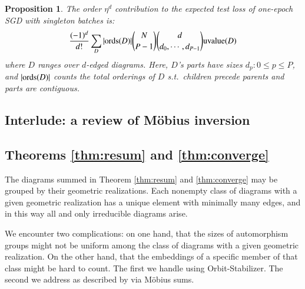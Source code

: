 \documentclass{article}
\theoremstyle{plain}
\newtheorem{prop}{Proposition}
\theoremstyle{definition}
\newcommand{\uvalue}{\text{\textnormal{uvalue}}}
\newcommand{\ords}{\text{\textnormal{ords}}}
\begin{document}
        \begin{prop} \label{prop:vanilla}
            The order $\eta^d$ contribution to the expected test loss of
            one-epoch SGD with singleton batches is:
            \begin{equation*}\label{eq:sgdbasiccoef}
                \frac{(-1)^d}{d!} \sum_{D} 
                |\ords(D)| {N \choose P-1} {d \choose d_0,\cdots,d_{P-1}}
                \uvalue(D)
            \end{equation*}
            where $D$ ranges over $d$-edged diagrams.  Here, $D$'s parts have
            sizes $d_p: 0\leq p\leq P$, and $|\ords(D)|$ counts the total
            orderings of $D$ s.t.\ children precede parents and parts are
            contiguous.
        \end{prop}

    \subsection{Interlude: a review of M\"obius inversion}          \label{appendix:mobius}

    \subsection{Theorems \ref{thm:resum} and \ref{thm:converge}}    \label{appendix:resum}

        The diagrams summed in Theorem \ref{thm:resum} and \ref{thm:converge}
        may be grouped by their geometric realizations.  Each nonempty class of
        diagrams with a given geometric realization has a unique element with
        minimally many edges, and in this way all and only irreducible diagrams
        arise. 

        We encounter two complications: on one hand, that the sizes of
        automorphism groups might not be uniform among the class of diagrams
        with a given geometric realization.  On the other hand, that the
        embeddings of a specific member of that class might be hard to count.
        The first we handle using Orbit-Stabilizer.  The second we address as
        described by \label{subsubsect:mobius} via M\"obius sums.
           
\end{document}
